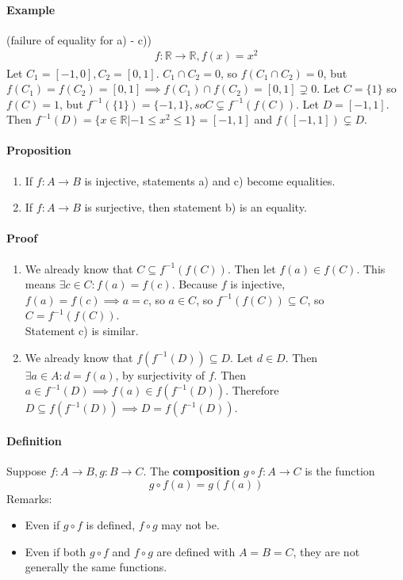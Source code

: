 \documentclass{article}
\newcommand{\mapab}[2]{{#1}\xrightarrow{}{#2}}
\newcommand{\mapAB}[2]{\mathbb{#1}\xrightarrow{}\mathbb{#2}}
\begin{document}
	\paragraph{Example} (failure of equality for a) - c))\newline
	\begin{align*}
	f:\mapAB{R}{R}, f(x) = x^2
	\end{align*}
	Let $C_1 = [-1,0], C_2 = [0,1]$. $C_1\cap C_2 = {0}$, so $f(C_1\cap C_2) = {0}$, but $f(C_1)=f(C_2)=[0,1]\implies f(C_1)\cap f(C_2) = [0,1]\supsetneq {0}$.\newline
	Let $C = \{1\}$ so $f(C)={1}$, but $f^{-1}(\{1\})=\{-1,1\}, so C\subsetneq f^{-1}(f(C))$.\newline
	Let $D=[-1,1]$. Then $f^{-1}(D)=\{x\in\mathbb{R}|-1\leq x^2\leq 1\}=[-1,1]$ and $f([-1,1])\subsetneq D$.
	\paragraph{Proposition}
	\begin{enumerate}[label=(\roman*)]
		\item If $f:\mapab{A}{B}$ is injective, statements a) and c) become equalities.\\
		\item If $f:\mapab{A}{B}$ is surjective, then statement b) is an equality.
	\end{enumerate}
	\paragraph{Proof}
	\begin{enumerate}[label=(\roman*)]
		\item We already know that $C\subseteq f^{-1}(f(C))$. Then let $f(a) \in f(C)$. This means $\exists c\in C:f(a) = f(c)$. Because $f$ is injective, $f(a) = f(c)\implies a=c$, so $a\in C$, so $f^{-1}(f(C))\subseteq C$, so $C = f^{-1}(f(C))$.\\
		Statement c) is similar.\\
		\item We already know that $f(f^{-1}(D)) \subseteq D$. Let $d\in D$. Then $\exists a\in A:d=f(a)$, by surjectivity of $f$. Then $a\in f^{-1}(D) \implies f(a)\in f(f^{-1}(D))$. Therefore $D\subseteq f(f^{-1}(D))\implies D=f(f^{-1}(D))$. 
	\end{enumerate}
	\paragraph{Definition}
	Suppose $f:\mapab{A}{B}, g:\mapab{B}{C}.$\newline
	The \textbf{composition} $g\circ f:\mapab{A}{C}$ is the function
	\begin{equation*}
	g\circ f(a) = g(f(a))
	\end{equation*}
	Remarks:
	\begin{itemize}
		\item Even if $g\circ f$ is defined, $f\circ g$ may not be.\\
		\item Even if both $g\circ f$ and $f\circ g$ are defined with $A=B=C$, they are not generally the same functions.
	\end{itemize}
\end{document}
